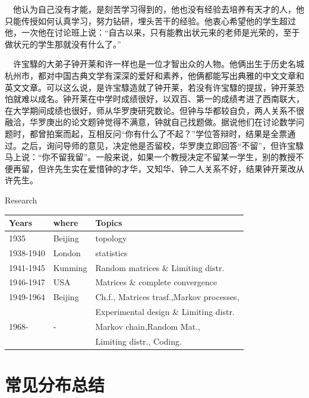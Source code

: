 \begin{frame}
	$\quad$他认为自己没有才能，是刻苦学习得到的，他也没有经验去培养有天才的人，他只能传授如何认真学习，努力钻研，埋头苦干的经验。他衷心希望他的学生超过他，一次他在讨论班上说：“自古以来，只有能教出状元来的老师是光荣的，至于做状元的学生那就没有什么了。”
	
	$\quad$许宝騄的大弟子钟开莱和许一样也是一位才智出众的人物。他俩出生于历史名城杭州市，都对中国古典文学有深深的爱好和素养，他俩都能写出典雅的中文文章和英文文章。可以这么说，是许宝騄造就了钟开莱，若没有许宝騄的提拔，钟开莱恐怕就难以成名。钟开莱在中学时成绩很好，以双百、第一的成绩考进了西南联大，在大学期间成绩也很好，师从华罗庚研究数论。但钟与华都较自负，两人关系不很融洽，华罗庚出的论文题钟觉得不满意，钟就自己找题做。据说他们在讨论数学问题时，都曾拍案而起，互相反问“你有什么了不起？”学位答辩时，结果是全票通过。之后，询问导师的意见，决定他是否留校，华罗庚立即回答“不留”，但许宝騄马上说：“你不留我留”。一般来说，如果一个教授决定不留某一学生，别的教授不便再留，但许先生实在爱惜钟的才华，又知华、钟二人关系不好，结果钟开莱改从许先生。
	
\end{frame}

\begin{frame}{Research}
	$\quad$\begin{tabular}{|l|l|l|}
		\hline Years & where & Topics  \\
		\hline 1935 & Beijing & topology \\
		\hline 1938-1940 & London & statistics\\
		\hline 1941-1945 & Kunming & Random matrices \& Limiting distr.\\
		\hline 1946-1947 & USA & Matrices \& complete convergence \\
		\hline 1949-1964 & Beijing & Ch.f., Matrices trasf.,Markov processes, \\
		\hline & &  Experimental design \& Limiting distr. \\
		\hline 1968- & - & Markov chain,Random Mat.,\\
		\hline & & Limiting distr., Coding. \\
		\hline
	\end{tabular}
\end{frame}

\section*{常见分布总结}

